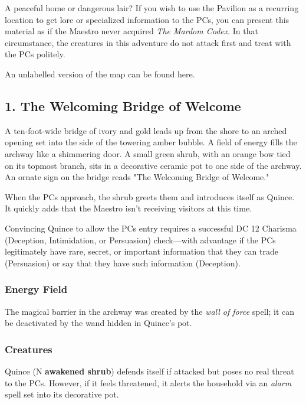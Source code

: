 \documentclass[10pt,a4paper,twoside,bg=print,twocolumn,openany,nodeprecatedcode]{dndbook}
\begin{document}
\begin{DndSidebar}[float=!b]{A peaceful home or dangerous lair?}
If you wish to use the Pavilion as a recurring location to get lore or specialized information to the PCs, you can present this material as if the Maestro never acquired \textit{The Mardom Codex}. In that circumstance, the creatures in this adventure do not attack first and treat with the PCs politely.



\end{DndSidebar}

An unlabelled version of the map can be found here.

\subsection{1. The Welcoming Bridge of Welcome}
\begin{DndReadAloud}{}
A ten-foot-wide bridge of ivory and gold leads up from the shore to an arched opening set into the side of the towering amber bubble. A field of energy fills the archway like a shimmering door. A small green shrub, with an orange bow tied on its topmost branch, sits in a decorative ceramic pot to one side of the archway. An ornate sign on the bridge reads "The Welcoming Bridge of Welcome."

\end{DndReadAloud}

When the PCs approach, the shrub greets them and introduces itself as Quince. It quickly adds that the Maestro isn't receiving visitors at this time.

Convincing Quince to allow the PCs entry requires a successful DC 12 Charisma (Deception, Intimidation, or Persuasion) check—with advantage if the PCs legitimately have rare, secret, or important information that they can trade (Persuasion) or say that they have such information (Deception).

\subsubsection{Energy Field}
The magical barrier in the archway was created by the \textit{wall of force} spell; it can be deactivated by the wand hidden in Quince's pot.

\subsubsection{Creatures}
Quince (N \textbf{awakened shrub}) defends itself if attacked but poses no real threat to the PCs. However, if it feels threatened, it alerts the household via an \textit{alarm} spell set into its decorative pot.
\end{document}
